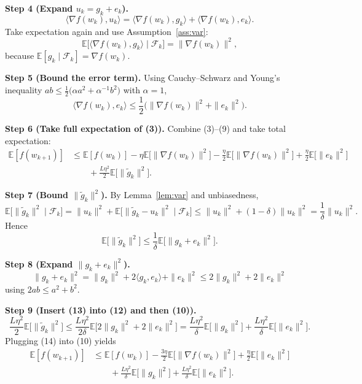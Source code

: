 \documentclass{article}
\newcommand{\E}{\mathbb{E}}
\begin{document}
\noindent\textbf{Step 4 (Expand $u_{k}=g_{k}+e_{k}$).}
\[
\langle\nabla f(w_{k}),u_{k}\rangle
= \langle\nabla f(w_{k}),g_{k}\rangle
  +\langle\nabla f(w_{k}),e_{k}\rangle .
\tag{7}
\]
Take expectation again and use Assumption~\ref{ass:var}:
\[
\E\!\big[\langle\nabla f(w_{k}),g_{k}\rangle\mid\mathcal{F}_{k}\big]
= \|\nabla f(w_{k})\|^{2},
\tag{8}
\]
because $\E[g_{k}\mid\mathcal{F}_{k}]=\nabla f(w_{k})$.

\noindent\textbf{Step 5 (Bound the error term).}
Using Cauchy–Schwarz and Young’s inequality $ab\le\frac{1}{2}\big(\alpha a^{2}+ \alpha^{-1}b^{2}\big)$ with $\alpha=1$,
\[
\langle\nabla f(w_{k}),e_{k}\rangle
\le \frac{1}{2}\big(\|\nabla f(w_{k})\|^{2}+\|e_{k}\|^{2}\big).
\tag{9}
\]

\noindent\textbf{Step 6 (Take full expectation of (3)).}
Combine (3)–(9) and take total expectation:
\[
\begin{aligned}
\E[f(w_{k+1})]
&\le \E[f(w_{k})]
   -\eta\E\!\big[\|\nabla f(w_{k})\|^{2}\big]
   -\frac{\eta}{2}\E\!\big[\|\nabla f(w_{k})\|^{2}\big]
   +\frac{\eta}{2}\E\!\big[\|e_{k}\|^{2}\big]  \\
&\qquad +\frac{L\eta^{2}}{2}\E\!\big[\|\tilde g_{k}\|^{2}\big].
\end{aligned}
\tag{10}
\]

\noindent\textbf{Step 7 (Bound $\|\tilde g_{k}\|^{2}$).}
By Lemma~\ref{lem:var} and unbiasedness,
\[
\E\!\big[\|\tilde g_{k}\|^{2}\mid\mathcal{F}_{k}\big]
= \|u_{k}\|^{2}+ \E\!\big[\|\tilde g_{k}-u_{k}\|^{2}\mid\mathcal{F}_{k}\big]
\le \|u_{k}\|^{2}+ (1-\delta)\|u_{k}\|^{2}
= \frac{1}{\delta}\|u_{k}\|^{2}.
\tag{11}
\]
Hence
\[
\E\!\big[\|\tilde g_{k}\|^{2}\big]\le \frac{1}{\delta}\E\!\big[\|g_{k}+e_{k}\|^{2}\big].
\tag{12}
\]

\noindent\textbf{Step 8 (Expand $\|g_{k}+e_{k}\|^{2}$).}
\[
\|g_{k}+e_{k}\|^{2}= \|g_{k}\|^{2}+2\langle g_{k},e_{k}\rangle+\|e_{k}\|^{2}
\le 2\|g_{k}\|^{2}+2\|e_{k}\|^{2}
\tag{13}
\]
using $2ab\le a^{2}+b^{2}$.

\noindent\textbf{Step 9 (Insert (13) into (12) and then (10)).}
\[
\frac{L\eta^{2}}{2}\E\!\big[\|\tilde g_{k}\|^{2}\big]
\le \frac{L\eta^{2}}{2\delta}\E\!\big[2\|g_{k}\|^{2}+2\|e_{k}\|^{2}\big]
= \frac{L\eta^{2}}{\delta}\E\!\big[\|g_{k}\|^{2}\big]
  +\frac{L\eta^{2}}{\delta}\E\!\big[\|e_{k}\|^{2}\big].
\tag{14}
\]
Plugging (14) into (10) yields
\[
\begin{aligned}
\E[f(w_{k+1})]
&\le \E[f(w_{k})]
   -\frac{3\eta}{2}\E\!\big[\|\nabla f(w_{k})\|^{2}\big]
   +\frac{\eta}{2}\E\!\big[\|e_{k}\|^{2}\big] \\
&\qquad +\frac{L\eta^{2}}{\delta}\E\!\big[\|g_{k}\|^{2}\big]
   +\frac{L\eta^{2}}{\delta}\E\!\big[\|e_{k}\|^{2}\big].
\end{aligned}
\tag{15}
\]
\end{document}
